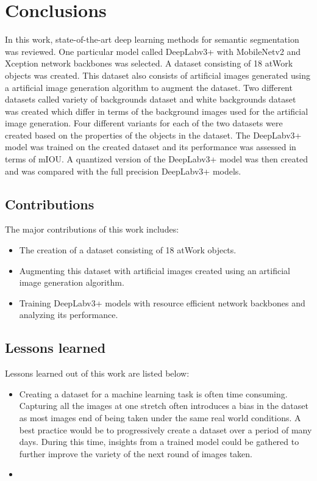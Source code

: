 
\chapter{Conclusions}

In this work, state-of-the-art deep learning methods for semantic segmentation was reviewed. One particular model called DeepLabv3+ with MobileNetv2 and Xception network backbones was selected. A dataset consisting of 18 atWork objects was created. This dataset also consists of artificial images generated using a artificial image generation algorithm to augment the dataset. Two different datasets called variety of backgrounds dataset and white backgrounds dataset was created which differ in terms of the background images used for the artificial image generation. Four different variants for each of the two datasets were created based on the properties of the objects in the dataset. The DeepLabv3+ model was trained on the created dataset and its performance was assessed in terms of mIOU. A quantized version of the DeepLabv3+ model was then created and was compared with the full precision DeepLabv3+ models.

\section{Contributions}

The major contributions of this work includes:
	\begin{itemize}
		\item The creation of a dataset consisting of 18 atWork objects.
		\item Augmenting this dataset with artificial images created using an artificial image generation algorithm.
		\item Training DeepLabv3+ models with resource efficient network backbones and analyzing its performance.
	\end{itemize}

\section{Lessons learned}

Lessons learned out of this work are listed below:
	\begin{itemize}
		\item Creating a dataset for a machine learning task is often time consuming. Capturing all the images at one stretch often introduces a bias in the dataset as most images end of being taken under the same real world conditions. A best practice would be to progressively create a dataset over a period of many days. During this time, insights from a trained model could be gathered to further improve the variety of the next round of images taken.
		\item 
	\end{itemize}

